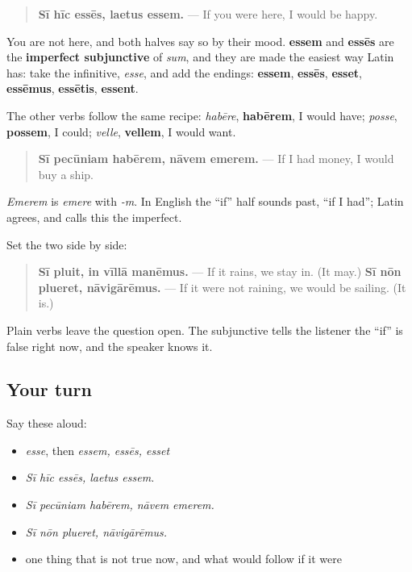 \begin{grammarlens}[title={Grammar Lens: the infinitive plus an ending}]
\begin{quote}
\textbf{Sī hīc essēs, laetus essem.} — If you were here, I would be happy.
\end{quote}

You are not here, and both halves say so by their mood. \textbf{essem} and \textbf{essēs} are the \textbf{imperfect subjunctive} of \emph{sum}, and they are made the easiest way Latin has: take the infinitive, \emph{esse}, and add the endings: \textbf{essem}, \textbf{essēs}, \textbf{esset}, \textbf{essēmus}, \textbf{essētis}, \textbf{essent}.

The other verbs follow the same recipe: \emph{habēre}, \textbf{habērem}, I would have; \emph{posse}, \textbf{possem}, I could; \emph{velle}, \textbf{vellem}, I would want.

\begin{quote}
\textbf{Sī pecūniam habērem, nāvem emerem.} — If I had money, I would buy a ship.
\end{quote}

\emph{Emerem} is \emph{emere} with \emph{-m}. In English the \textquotedblleft{}if\textquotedblright{} half sounds past, \textquotedblleft{}if I had\textquotedblright{}; Latin agrees, and calls this the imperfect.
\end{grammarlens}

\begin{culture}
Set the two side by side:

\begin{quote}
\textbf{Sī pluit, in vīllā manēmus.} — If it rains, we stay in. (It may.) \textbf{Sī nōn plueret, nāvigārēmus.} — If it were not raining, we would be sailing. (It is.)
\end{quote}

Plain verbs leave the question open. The subjunctive tells the listener the \textquotedblleft{}if\textquotedblright{} is false right now, and the speaker knows it.
\end{culture}

\subsection*{Your turn}
Say these aloud:

\begin{itemize}
\raggedright
  \item \emph{esse}, then \emph{essem, essēs, esset}
  \item \emph{Sī hīc essēs, laetus essem.}
  \item \emph{Sī pecūniam habērem, nāvem emerem.}
  \item \emph{Sī nōn plueret, nāvigārēmus.}
  \item one thing that is not true now, and what would follow if it were
\end{itemize}

